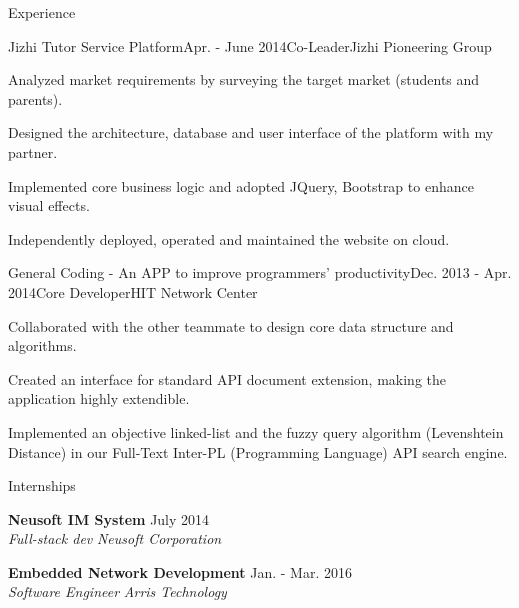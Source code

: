 \documentclass{resume} %
\begin{document}
\begin{rSection}{Experience}

\begin{rSubsection}{Jizhi Tutor Service Platform}{Apr. - June 2014}{Co-Leader}{Jizhi Pioneering Group}
\item Analyzed market requirements by surveying the target market (students and parents).
\item Designed the architecture, database and user interface of the platform with my partner.
\item Implemented core business logic and adopted JQuery, Bootstrap to enhance visual effects.
\item Independently deployed, operated and maintained the website on cloud.
\end{rSubsection}


\begin{rSubsection}{General Coding - An APP to improve programmers' productivity}{Dec. 2013 - Apr. 2014}{Core Developer}{HIT Network Center}
\item Collaborated with the other teammate to design core data structure and algorithms.
\item Created an interface for standard API document extension, making the application highly extendible.
\item Implemented an objective linked-list and the fuzzy query algorithm (Levenshtein Distance) in our Full-Text
Inter-PL (Programming Language) API search engine.
\end{rSubsection}


\end{rSection}



\begin{rSection}{Internships} \itemsep -2pt


{\bf Neusoft IM System} \hfill {July 2014} 
\\{\em Full-stack dev} \hfill {\em Neusoft Corporation}

{\bf Embedded Network Development} \hfill {Jan. - Mar. 2016} 
\\{\em Software Engineer} \hfill {\em Arris Technology}

\end{rSection}
\end{document}
